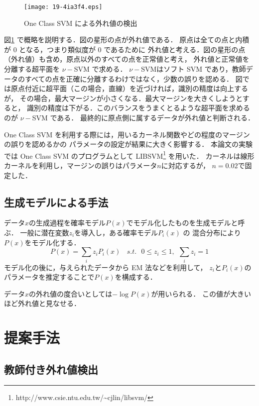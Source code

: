 \documentclass[japanese]{jnlp_1.4}
\begin{document}
\begin{figure}[t]
\begin{center}
\texttt{[image: 19-4ia3f4.eps]}
\end{center}
\caption{One Class SVM による外れ値の検出}
\label{ocs-ex}
\end{figure} 

図\ref{ocs-ex} で概略を説明する．図の星形の点が外れ値である．
原点は全ての点と内積が 0 となる，つまり類似度が 0 であるために
外れ値と考える．図の星形の点（外れ値）も含め，原点以外のすべての点を正常値と考え，
外れ値と正常値を分離する超平面を \(\nu-\)SVM で求める．
\(\nu-\)SVMはソフト SVM であり，教師データのすべての点を正確に分離するわけではなく，少数の誤りを認める．
図では原点付近に超平面（この場合，直線）を近づければ，識別の精度は向上するが，
その場合，最大マージンが小さくなる．最大マージンを大きくしようとすると，
識別の精度は下がる．このバランスをうまくとるような超平面を求めるのが \(\nu-\)SVM である．
最終的に原点側に属するデータが外れ値と判断される．

One Class SVM を利用する際には，用いるカーネル関数やどの程度のマージンの誤りを認めるかの
パラメータの設定が結果に大きく影響する．
本論文の実験では One Class SVM のプログラムとして 
LIBSVM\footnote{http://www.csie.ntu.edu.tw/\~{}cjlin/libsvm/} を用いた．
カーネルは線形カーネルを利用し，マージンの誤りはパラメータ\( n \)に対応するが，
\( n = 0.02 \)で固定した．


\subsection{生成モデルによる手法}

データ\( x \)の生成過程を確率モデル\( P(x) \)でモデル化したものを生成モデルと呼ぶ．
一般に潜在変数\( z_i \)を導入し，ある確率モデル\( P_i(x) \) の
混合分布により\( P(x) \)をモデル化する．
\[
P(x) = \sum_{i} z_i P_i(x) \ \ \ \ s.t.\ \ \  0 \le z_i \le 1,\ \ \sum_i z_i = 1
\]
モデル化の後に，与えられたデータから EM 法などを利用して，
\( z_i \)と\( P_i(x) \)のパラメータを推定することで\( P(x) \)を構成する．

データ\( x \)の外れ値の度合いとしては\( - \log P(x) \)が用いられる．
この値が大きいほど外れ値と見なせる．



\section{提案手法}

\subsection{教師付き外れ値検出}
\end{document}
